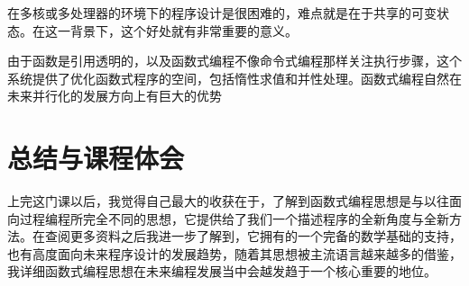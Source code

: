 \documentclass{article}
\begin{document}
		在多核或多处理器的环境下的程序设计是很困难的，难点就是在于共享的可变状态。在这一背景下，这个好处就有非常重要的意义。 
		
		由于函数是引用透明的，以及函数式编程不像命令式编程那样关注执行步骤，这个系统提供了优化函数式程序的空间，包括惰性求值和并性处理。函数式编程自然在未来并行化的发展方向上有巨大的优势
	
	\section{总结与课程体会}
	上完这门课以后，我觉得自己最大的收获在于，了解到函数式编程思想是与以往面向过程编程所完全不同的思想，它提供给了我们一个描述程序的全新角度与全新方法。在查阅更多资料之后我进一步了解到，它拥有的一个完备的数学基础的支持，也有高度面向未来程序设计的发展趋势，随着其思想被主流语言越来越多的借鉴，我详细函数式编程思想在未来编程发展当中会越发趋于一个核心重要的地位。
\end{document}
